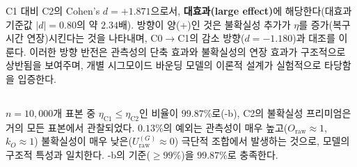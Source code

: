  C1 대비 C2의 Cohen's $d = +1.871$으로서, \textbf{대효과(large effect)}에
해당한다(대효과 기준값 $|d|=0.80$의 약 $2.34$배).
방향이 양(+)인 것은 불확실성 추가가 $\eta$를 증가(복구 시간
연장)시킨다는 것을 나타내며, C0$\to$C1의 감소 방향($d = -1.180$)과
대조를 이룬다. 이러한 방향 반전은 관측성의 단축 효과와 불확실성의
연장 효과가 구조적으로 상반됨을 보여주며,
개별 시그모이드 바운딩 모델의 이론적 설계가 실험적으로 타당함을 입증한다.


\subsection{}
\label{subsec:c2_order}

$n = 10{,}000$개 표본 중 $\eta_{\text{C1}} \leq \eta_{\text{C2}}$인
비율이 $99.87\%$로(-b), C2의 불확실성 프리미엄은 거의 모든
표본에서 관찰되었다. $0.13\%$의 예외는 관측성이 매우 높고($O_{\text{raw}} \approx 1$,
$k_O \approx 1$) 불확실성이 매우 낮은($U_{\text{raw}}^{(G)} \approx 0$) 극단적 조합에서
발생하는 것으로, 모델의 구조적 특성과 일치한다.
-b의 기준($\geq 99\%$)을 $99.87\%$로 충족한다.

 
